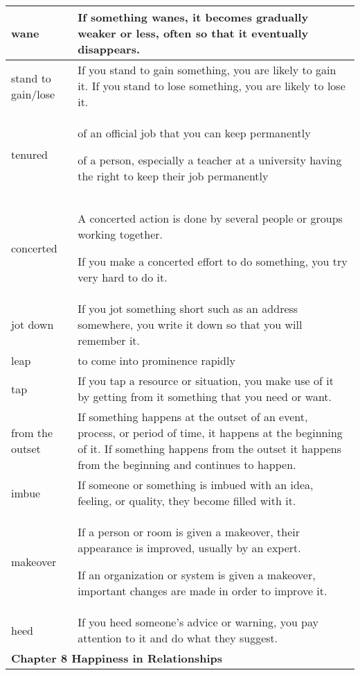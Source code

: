 \documentclass{article}
\begin{document}
\begin{center}
\begin{longtable}{|l|p{9cm}|}
\hline
wane
&
If something wanes, it becomes gradually weaker or less, often so that it eventually disappears.
\\

\hline
stand to gain/lose
&
If you stand to gain something, you are likely to gain it. If you stand to lose something, you are likely to lose it.
\\

\hline
tenured
&
of an official job that you can keep permanently
\par
of a person, especially a teacher at a university having the right to keep their job permanently
\\

\hline
concerted
&
A concerted action is done by several people or groups working together.
\par
If you make a concerted effort to do something, you try very hard to do it.
\\

\hline
jot down
&
If you jot something short such as an address somewhere, you write it down so that you will remember it.
\\

\hline
leap
&
to come into prominence rapidly
\\

\hline
tap
&
If you tap a resource or situation, you make use of it by getting from it something that you need or want.
\\

\hline
from the outset
&
If something happens at the outset of an event, process, or period of time, it happens at the beginning of it. If something happens from the outset it happens from the beginning and continues to happen.
\\

\hline
imbue
&
If someone or something is imbued with an idea, feeling, or quality, they become filled with it.
\\

\hline
makeover
&
If a person or room is given a makeover, their appearance is improved, usually by an expert.
\par
If an organization or system is given a makeover, important changes are made in order to improve it.
\\

\hline
heed
&
If you heed someone's advice or warning, you pay attention to it and do what they suggest.
\\

\hline
\multicolumn{2}{|l|}{\textbf{Chapter 8 Happiness in Relationships}}
\\


\end{longtable}
\end{center}
\end{document}
